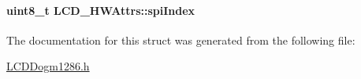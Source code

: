 \paragraph[{spi\+Index}]{\setlength{\rightskip}{0pt plus 5cm}uint8\+\_\+t L\+C\+D\+\_\+\+H\+W\+Attrs\+::spi\+Index}\label{struct_l_c_d___h_w_attrs_aad817df3726cc746fd22075f4510e9d6}


The documentation for this struct was generated from the following file\+:\begin{DoxyCompactItemize}
\item 
\hyperlink{_l_c_d_dogm1286_8h}{L\+C\+D\+Dogm1286.\+h}\end{DoxyCompactItemize}
